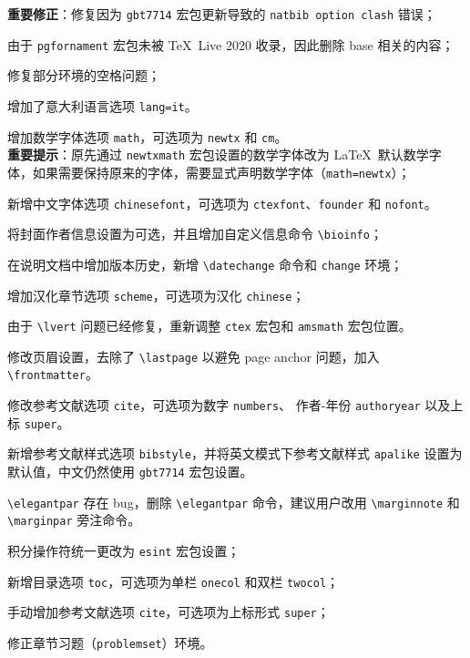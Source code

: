 \documentclass[lang=cn,newtx,10pt,scheme=chinese]{elegantbook}
\begin{document}
\begin{change}
  \item \textbf{重要修正}：修复因为 \lstinline{gbt7714} 宏包更新导致的 \lstinline{natbib option clash} 错误；
  \item 由于 \lstinline{pgfornament} 宏包未被 \TeX~Live 2020 收录，因此删除 base 相关的内容；
  \item 修复部分环境的空格问题；
  \item 增加了意大利语言选项 \lstinline{lang=it}。
\end{change}



\begin{change}
  \item 增加数学字体选项 \lstinline{math}，可选项为 \lstinline{newtx} 和 \lstinline{cm}。\\
  \textbf{重要提示}：原先通过 \lstinline{newtxmath} 宏包设置的数学字体改为 \LaTeX\ 默认数学字体，如果需要保持原来的字体，需要显式声明数学字体（\lstinline{math=newtx}）；
  \item 新增中文字体选项 \lstinline{chinesefont}，可选项为 \lstinline{ctexfont}、\lstinline{founder} 和 \lstinline{nofont}。
  \item 将封面作者信息设置为可选，并且增加自定义信息命令 \lstinline{\bioinfo}；
  \item 在说明文档中增加版本历史，新增 \lstinline{\datechange} 命令和 \lstinline{change} 环境；
  \item 增加汉化章节选项 \lstinline{scheme}，可选项为汉化 \lstinline{chinese}；
  \item 由于 \lstinline{\lvert} 问题已经修复，重新调整 \lstinline{ctex} 宏包和 \lstinline{amsmath} 宏包位置。
  \item 修改页眉设置，去除了 \lstinline{\lastpage} 以避免 page anchor 问题，加入 \lstinline{\frontmatter}。
  \item 修改参考文献选项 \lstinline{cite}，可选项为数字 \lstinline{numbers}、 作者-年份 \lstinline{authoryear} 以及上标 \lstinline{super}。
  \item 新增参考文献样式选项 \lstinline{bibstyle}，并将英文模式下参考文献样式 \lstinline{apalike} 设置为默认值，中文仍然使用 \lstinline{gbt7714} 宏包设置。
\end{change}


\begin{change}
  \item \lstinline{\elegantpar} 存在 bug，删除 \lstinline{\elegantpar} 命令，建议用户改用 \lstinline{\marginnote} 和 \lstinline{\marginpar} 旁注命令。
  \item 积分操作符统一更改为 \lstinline{esint} 宏包设置；
  \item 新增目录选项 \lstinline{toc}，可选项为单栏 \lstinline{onecol} 和双栏 \lstinline{twocol}；
  \item 手动增加参考文献选项 \lstinline{cite}，可选项为上标形式 \lstinline{super}；
  \item 修正章节习题（\lstinline{problemset}）环境。
\end{change}
\end{document}
